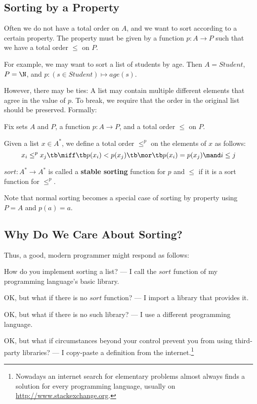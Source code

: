 \subsection{Sorting by a Property}\label{sec:ad:sort:stable}

Often we do not have a total order on $A$, and we want to sort according to a certain property.
The property must be given by a function $p:A\to P$ such that we have a total order $\leq$ on $P$.

For example, we may want to sort a list of students by age.
Then $A=Student$, $P=\N$, and $p:(s\in Student)\mapsto age(s)$.

However, there may be ties: A list may contain multiple different elements that agree in the value of $p$.
To break, we require that the order in the original list should be preserved.
Formally:

\begin{definition}\label{def:ad:sort:stable}
Fix sets $A$ and $P$, a function $p:A\to P$, and a total order $\leq$ on $P$.

Given a list $x\in A^*$, we define a total order $\leq^p$ on the elements of $x$ as follows:
 \[x_i \leq^p x_j \tb\miff\tb p(x_i) < p(x_j) \tb \mor \tb p(x_i)=p(x_j) \mand i\leq j\]

$sort:A^*\to A^*$ is called a \textbf{stable sorting} function for $p$ and $\leq$ if it is a sort function for $\leq^p$.
\end{definition}

Note that normal sorting becomes a special case of sorting by property using $P=A$ and $p(a)=a$.

\subsection{Why Do We Care About Sorting?}

Thus, a good, modern programmer might respond as follows:
\begin{compactenum}
\item How do you implement sorting a list? --- I call the $\mathit{sort}$ function of my programming language's basic library.
\item OK, but what if there is no $\mathit{sort}$ function? --- I import a library that provides it.
\item OK, but what if there is no such library? --- I use a different programming language.
\item OK, but what if circumstances beyond your control prevent you from using third-party libraries? --- I copy-paste a definition from the internet.\footnote{Nowadays an internet search for elementary problems almost always finds a solution for every programming language, usually on \url{http://www.stackexchange.org}.}
\end{compactenum}

